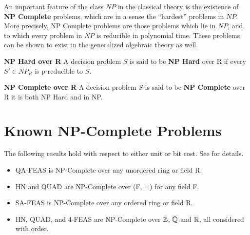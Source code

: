 An important feature of the class $NP$ in the classical theory is the
existence of \textbf{NP Complete} problems, which are in a sense the
``hardest'' problems in $NP$.  More precisely, NP Complete problems
are those problems which lie in $NP$, and to which every problem in
$NP$ is reducible in polynomial time.  These problems can be shown to
exist in the generalized algebraic theory as well.

\begin{definition}{\textbf{NP Hard over R}}
  A decision problem $S$ is said to be \textbf{NP Hard} over R if
  every $S' \in NP_R$ is p-reducible to $S$.
\end{definition}

\begin{definition}{\textbf{NP Complete over R}}
  A decision problem $S$ is said to be \textbf{NP Complete} over R it
  is both NP Hard and in NP.
\end{definition}

\section{Known NP-Complete Problems}

The following results hold with respect to either unit or bit cost.
See \cite{B98} for details.  

\begin{itemize}
\item QA-FEAS is NP-Complete over any unordered ring or field R.
\item HN and QUAD are NP-Complete over (F, =) for any field F.
\item SA-FEAS is NP-Complete over any ordered ring or field R.
\item HN, QUAD, and 4-FEAS are NP-Complete over $\mathbb{Z}$,
  $\mathbb{Q}$ and $\mathbb{R}$, all considered with order.
\end{itemize}


